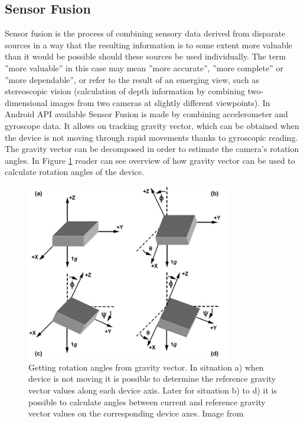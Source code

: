 \subsection[Sensor Fusion]{Sensor Fusion\cite{website:sensorFustion}}
Sensor fusion is the process of combining sensory data derived from disparate sources in a way that the resulting information is to some extent more valuable than it would be possible should these sources be used individually. The term ''more valuable'' in this case may mean ''more accurate'', ''more complete'' or ''more dependable'', or refer to the result of an emerging view, such as stereoscopic vision (calculation of depth information by combining two-dimensional images from two cameras at slightly different viewpoints). 
In Android API available Sensor Fusion is made by combining accelerometer and gyroscope data. It allows on tracking gravity vector, which can be obtained when the device is not moving through rapid movements thanks to gyroscopic reading. The gravity vector can be decomposed in order to estimate the camera's rotation angles. In Figure \ref{fig:angles_from_gravity} reader can see overview of how gravity vector can be used to calculate rotation angles of the device. 
\begin{figure}[h!]
    \centering
    \includegraphics[width=0.8\textwidth]{angles_from_gravity}
    \caption[Getting rotation angles from gravity vector]{Getting rotation angles from gravity vector. In situation a) when device is not moving it is possible to determine the reference gravity vector values along each device axis. Later for situation b) to d) it is possible to calculate angles between current and reference gravity vector values on the corresponding device axes. Image from \cite{website:gravity_orientation}}
    \label{fig:angles_from_gravity}
\end{figure}
